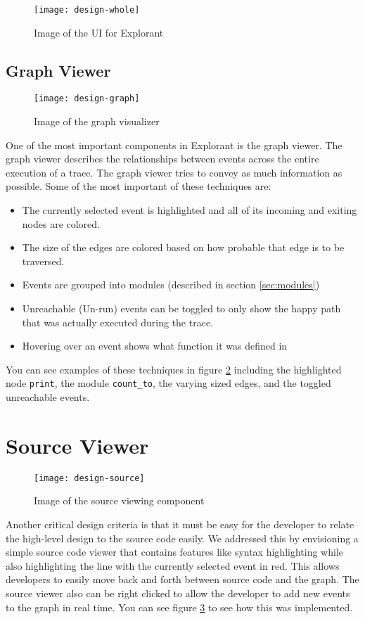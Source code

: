 \begin{figure}[!ht]
    \centering
    \texttt{[image: design-whole]}
    \caption{Image of the UI for Explorant}
    \label{fig:graph-whole}
\end{figure}

\subsection{Graph Viewer}
\begin{figure}[!ht]
    \centering
    \texttt{[image: design-graph]}
    \caption{Image of the graph visualizer}
    \label{fig:graph}
\end{figure}
One of the most important components in Explorant is the graph viewer. The graph viewer describes the relationships between events across the entire execution of a trace. The graph viewer tries to convey as much information as possible. Some of the most important of these techniques are: 
\begin{itemize}
    \item The currently selected event is highlighted and all of its incoming and exiting nodes are colored. 
    \item The size of the edges are colored based on how probable that edge is to be traversed. 
    \item Events are grouped into modules (described in section \ref{sec:modules})
    \item Unreachable (Un-run) events can be toggled to only show the happy path that was actually executed during the trace.
    \item Hovering over an event shows what function it was defined in
\end{itemize}
You can see examples of these techniques in figure \ref{fig:graph} including the highlighted node \texttt{print}, the module \texttt{count\_to}, the varying sized edges, and the toggled unreachable events. 






\section{Source Viewer}
\begin{figure}[!ht]
    \centering
    \texttt{[image: design-source]}
    \caption{Image of the source viewing component}
    \label{fig:graph-src}
\end{figure}
Another critical design criteria is that it must be easy for the developer to relate the high-level design to the source code easily. We addressed this by envisioning a simple source code viewer that contains features like syntax highlighting while also highlighting the line with the currently selected event in red. This allows developers to easily move back and forth between source code and the graph. The source viewer also can be right clicked to allow the developer to add new events to the graph in real time. You can see figure \ref{fig:graph-src} to see how this was implemented.


